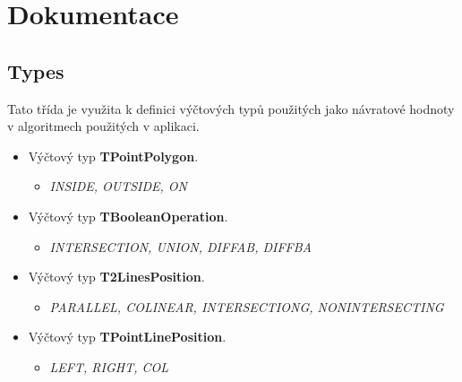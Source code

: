 \documentclass[a4paper, 12pt]{article}
\begin{document}
\clearpage



\section{Dokumentace}

\subsection{Types}
Tato třída je využita k definici výčtových typů použitých jako návratové hodnoty v algoritmech použitých v aplikaci.
\begin{itemize}
	\item Výčtový typ \textbf{TPointPolygon}.
	\begin{itemize}
		\item \textit{INSIDE, OUTSIDE, ON}
	\end{itemize}
	\item Výčtový typ \textbf{TBooleanOperation}.
	\begin{itemize}
		\item \textit{INTERSECTION, UNION, DIFFAB, DIFFBA}
	\end{itemize}
	\item Výčtový typ \textbf{T2LinesPosition}.
	\begin{itemize}
		\item \textit{PARALLEL, COLINEAR, INTERSECTIONG, NONINTERSECTING}
	\end{itemize}
	\item Výčtový typ \textbf{TPointLinePosition}.
	\begin{itemize}
		\item \textit{LEFT, RIGHT, COL}
	\end{itemize}
\end{itemize}
\end{document}
